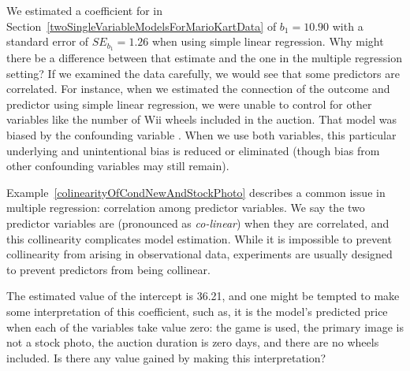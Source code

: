 \begin{examplewrap}
\begin{nexample}{We estimated a coefficient for  in Section~\ref{twoSingleVariableModelsForMarioKartData} of $b_1 = 10.90$ with a standard error of $SE_{b_1} = 1.26$ when using simple linear regression. Why might there be a difference between that estimate and the one in the multiple regression setting?} \label{colinearityOfCondNewAndStockPhoto}
If we examined the data carefully, we would see that some predictors are correlated. For instance, when we estimated the connection of the outcome  and predictor  using simple linear regression, we were unable to control for other variables like the number of Wii wheels included in the auction. That model was biased by the confounding variable . When we use both variables, this particular underlying and unintentional bias is reduced or eliminated (though bias from other confounding variables may still remain).
\end{nexample}
\end{examplewrap}

Example~\ref{colinearityOfCondNewAndStockPhoto} describes a common issue in multiple regression: correlation among predictor variables. We say the two predictor variables are  (pronounced as \emph{co-linear}) when they are correlated, and this collinearity complicates model estimation. While it is impossible to prevent collinearity from arising in observational data, experiments are usually designed to prevent predictors from being collinear.

\begin{exercisewrap}
\begin{nexercise}
The estimated value of the intercept is 36.21, and one might be tempted to make some interpretation of this coefficient, such as, it is the model's predicted price when each of the variables take value zero: the game is used, the primary image is not a stock photo, the auction duration is zero days, and there are no wheels included. Is there any value gained by making this interpretation?\footnotemark
\end{nexercise}
\end{exercisewrap}


